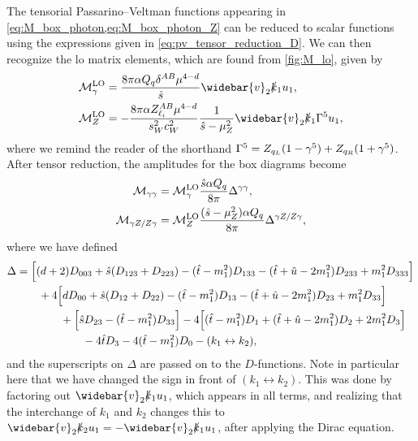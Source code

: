 The tensorial Passarino--Veltman functions appearing in \cref{eq:M_box_photon,eq:M_box_photon_Z} can be reduced to scalar functions using the expressions given in \cref{eq:pv_tensor_reduction_D}.
We can then recognize the \gls{lo} matrix elements, which are found from \cref{fig:M_lo}, given by
\begin{align}
    \M^{\mathrm{LO}}_\gamma &= \frac{8\pi\alpha Q_q \delta^{AB} \mu^{4-d}}{\shat} \widebar{v}_2 \koneslash u_1,
    \\
    \M^{\mathrm{LO}}_Z &= -\frac{8\pi\alpha\zliab \mu^{4-d}}{s_W^2c_W^2} \frac{1}{\shat-\mu_Z^2} \widebar{v}_2 \koneslash \Gamma^5 u_1,
    \label{eq:M_lo}
\end{align}
where we remind the reader of the shorthand $\Gamma^5=Z_{q_L}(1-\gamma^5)+Z_{q_R}(1+\gamma^5)$.
After tensor reduction, the amplitudes for the box diagrams become
\begin{subequations}
\begin{align}
    \mathcal{M}_{\gamma\gamma} &= \mathcal{M}^{\mathrm{LO}}_\gamma \frac{\hat{s}\alpha Q_q}{8\pi} \Delta^{\gamma\gamma},
    \\
    \mathcal{M}_{\gamma Z/Z\gamma} &= \mathcal{M}^{\mathrm{LO}}_Z \frac{(\hat{s}-\mu_Z^2)\alpha Q_q}{8\pi} \Delta^{\gamma Z/Z\gamma},
\end{align}
\end{subequations}
where we have defined
\begin{equation}
\begin{split}
    \Delta &= \Bigl[
        (d+2)D_{003} + \hat{s}(D_{123}+D_{223})
        - (\hat{t}-m_1^2)D_{133} - (\hat{t}+\hat{u}-2m_1^2)D_{233} + m_1^2D_{333}
    \Bigr]
    \\ &\qquad
    + 4 \Bigl[
        dD_{00} + \hat{s}(D_{12}+D_{22})
        - (\hat{t}-m_1^2)D_{13} - (\hat{t}+\hat{u}-2m_1^2) D_{23} + m_1^2D_{33}
    \Bigr]
    \\ &\qquad\qquad
    + \Bigl[
        \hat{s} D_{23} - (\hat{t}-m_1^2)D_{33}
    \Bigr] - 4\Bigl[
        (\hat{t}-m_1^2)D_1 + (\hat{t}+\hat{u}-2m_1^2)D_2 + 2m_1^2 D_3
    \Bigr]
    \\ &\qquad\qquad\qquad
    - 4 \hat{t} D_3 - 4(\hat{t}-m_1^2) D_0
    - (k_1 \leftrightarrow k_2),
\end{split}
\end{equation}
and the superscripts on $\Delta$ are passed on to the $D$-functions.
Note in particular here that we have changed the sign in front of $(k_1 \leftrightarrow k_2)$. This was done by factoring out $\widebar{v}_2\koneslash u_1$, which appears in all terms, and realizing that the interchange of $k_1$ and $k_2$ changes this to $\widebar{v}_2\ktwoslash u_1 = -\widebar{v}_2\koneslash u_1$, after applying the Dirac equation.

